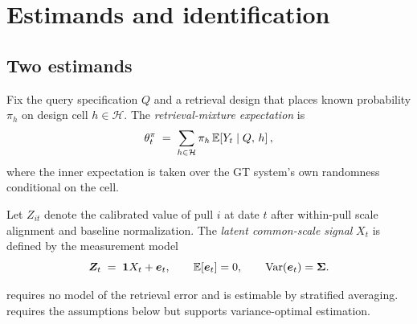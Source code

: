 \documentclass[12pt,a4paper,oneside]{article}
\begin{document}
\section{Estimands and identification}\label{sec:identification}

\subsection{Two estimands}

\begin{definition}\label{def:mixture}
Fix the query specification $Q$ and a retrieval design that places known
probability $\pi_h$ on design cell $h \in \mathcal{H}$. The
\emph{retrieval-mixture expectation} is
\begin{equation}
\theta_t^{\pi} \;=\; \sum_{h \in \mathcal{H}} \pi_h \,
\mathbb{E}\!\left[Y_{t} \mid Q,\, h \right],
\label{eq:mixture}
\end{equation}
where the inner expectation is taken over the GT system's own randomness
conditional on the cell.
\end{definition}

\begin{definition}\label{def:latent}
Let $Z_{it}$ denote the calibrated value of pull $i$ at date $t$ after
within-pull scale alignment and baseline normalization. The \emph{latent
common-scale signal} $X_t$ is defined by the measurement model
\begin{equation}
\bm{Z}_t \;=\; \bm{1} X_t + \bm{e}_t, \qquad \mathbb{E}[\bm{e}_t] = 0, \qquad
\operatorname{Var}(\bm{e}_t) = \bm{\Sigma} .
\label{eq:consensus-model}
\end{equation}
\end{definition}

 requires no model of the retrieval error and is estimable by
stratified averaging.  requires the assumptions below but
supports variance-optimal estimation.
\end{document}
